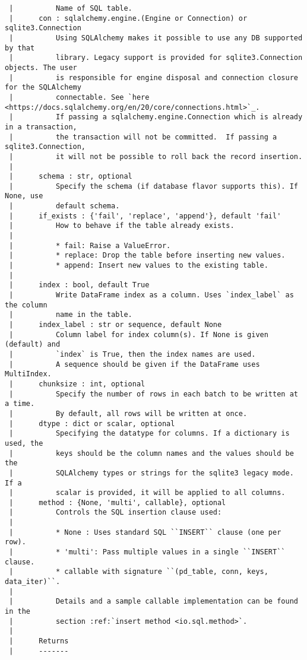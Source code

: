 \documentclass[
  letterpaper,
  DIV=11,
  numbers=noendperiod]{scrreprt}
\begin{document}
\begin{verbatim}
 |          Name of SQL table.
 |      con : sqlalchemy.engine.(Engine or Connection) or sqlite3.Connection
 |          Using SQLAlchemy makes it possible to use any DB supported by that
 |          library. Legacy support is provided for sqlite3.Connection objects. The user
 |          is responsible for engine disposal and connection closure for the SQLAlchemy
 |          connectable. See `here                 <https://docs.sqlalchemy.org/en/20/core/connections.html>`_.
 |          If passing a sqlalchemy.engine.Connection which is already in a transaction,
 |          the transaction will not be committed.  If passing a sqlite3.Connection,
 |          it will not be possible to roll back the record insertion.
 |      
 |      schema : str, optional
 |          Specify the schema (if database flavor supports this). If None, use
 |          default schema.
 |      if_exists : {'fail', 'replace', 'append'}, default 'fail'
 |          How to behave if the table already exists.
 |      
 |          * fail: Raise a ValueError.
 |          * replace: Drop the table before inserting new values.
 |          * append: Insert new values to the existing table.
 |      
 |      index : bool, default True
 |          Write DataFrame index as a column. Uses `index_label` as the column
 |          name in the table.
 |      index_label : str or sequence, default None
 |          Column label for index column(s). If None is given (default) and
 |          `index` is True, then the index names are used.
 |          A sequence should be given if the DataFrame uses MultiIndex.
 |      chunksize : int, optional
 |          Specify the number of rows in each batch to be written at a time.
 |          By default, all rows will be written at once.
 |      dtype : dict or scalar, optional
 |          Specifying the datatype for columns. If a dictionary is used, the
 |          keys should be the column names and the values should be the
 |          SQLAlchemy types or strings for the sqlite3 legacy mode. If a
 |          scalar is provided, it will be applied to all columns.
 |      method : {None, 'multi', callable}, optional
 |          Controls the SQL insertion clause used:
 |      
 |          * None : Uses standard SQL ``INSERT`` clause (one per row).
 |          * 'multi': Pass multiple values in a single ``INSERT`` clause.
 |          * callable with signature ``(pd_table, conn, keys, data_iter)``.
 |      
 |          Details and a sample callable implementation can be found in the
 |          section :ref:`insert method <io.sql.method>`.
 |      
 |      Returns
 |      -------

\end{verbatim}
\end{document}
